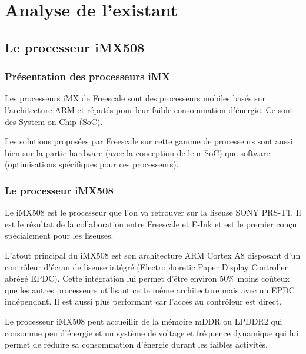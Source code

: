 \chapter{Analyse de l'existant}

\section{Le processeur iMX508}

\subsection{Présentation des processeurs iMX}

Les processeurs iMX de Freescale sont des processeurs mobiles basés sur l'architecture ARM et réputés pour leur faible consommation d'énergie. Ce sont des System-on-Chip (SoC).


Les solutions proposées par Freescale sur cette gamme de processeurs sont aussi bien sur la partie hardware (avec la conception de leur SoC) que software (optimisations spécifiques pour ces processeurs).

\subsection{Le processeur iMX508}

Le iMX508 est le processeur que l'on va retrouver sur la liseuse SONY PRS-T1. Il est le résultat de la collaboration entre Freescale et E-Ink et est le premier conçu spécialement pour les liseuses. 

L'atout principal du iMX508 est son architecture ARM Cortex A8 disposant d'un contrôleur d'écran de liseuse intégré (Electrophoretic Paper Display Controller abrégé EPDC). Cette intégration lui permet d'être environ 50\% moins coûteux que les autres processeurs utilisant cette même architecture mais avec un EPDC indépendant. Il est aussi plus performant car l'accès au contrôleur est direct.

Le processeur iMX508 peut accueillir de la mémoire mDDR ou LPDDR2 qui consomme peu d'énergie et un système de voltage et fréquence dynamique qui lui permet de réduire sa consommation d'énergie durant les faibles activités.

